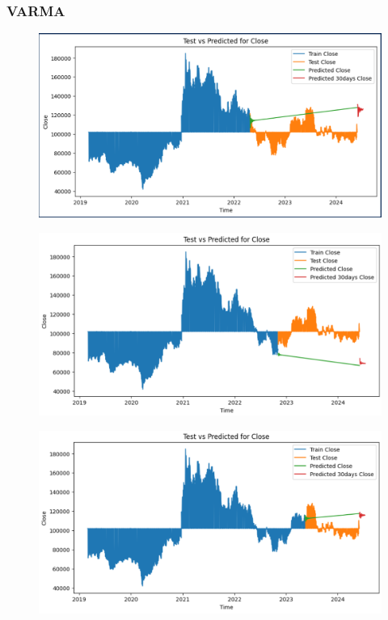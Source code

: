 \documentclass{article}
\begin{document}
\begin{multicols}{2}
\subsubsection{VARMA}
\begin{figure}[H]
    \centering
    \begin{minipage}{0.15\textwidth}
    \centering
    \includegraphics[width=1\textwidth]{Image/VARMA/LG/6_4/30.png}
   
    \label{fig:1}
    \end{minipage}%
    \begin{minipage}{0.15\textwidth}
    \centering
    \includegraphics[width=1\textwidth]{Image/VARMA/LG/7_3/30.png}
  
    \label{fig:2}
    \end{minipage}%
    \begin{minipage}{0.15\textwidth}
    \centering
    \includegraphics[width=1\textwidth]{Image/VARMA/LG/8_2/30.png}


\end{minipage}
\end{figure}
\end{multicols}
\end{document}
